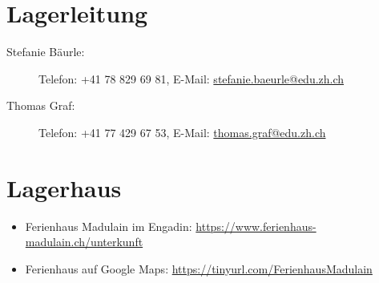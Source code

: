  \section*{Lagerleitung}
 \begin{description}
   \item[Stefanie Bäurle:] Telefon: +41 78 829 69 81, E-Mail: \url{stefanie.baeurle@edu.zh.ch}
   \item[Thomas Graf:] Telefon: +41 77 429 67 53, E-Mail: \url{thomas.graf@edu.zh.ch}
 \end{description}


 \section*{Lagerhaus}
 \begin{itemize}
  \item Ferienhaus Madulain im Engadin: \url{https://www.ferienhaus-madulain.ch/unterkunft}
  \item Ferienhaus auf Google Maps: \url{https://tinyurl.com/FerienhausMadulain}
 \end{itemize}
